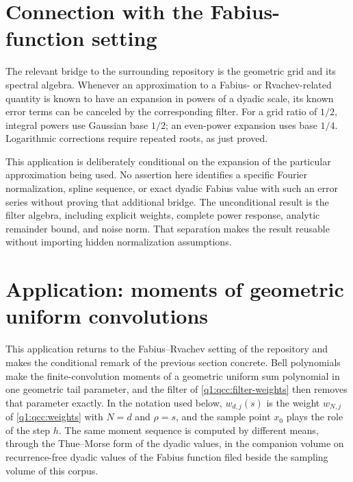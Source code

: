 \documentclass[11pt,a4paper,oneside,openany]{book}
\theoremstyle{definition}
\theoremstyle{remark}
\begin{document}
\section{Connection with the Fabius-function setting}
The relevant bridge to the surrounding repository is the geometric grid and its
spectral algebra. Whenever an approximation to a Fabius- or Rvachev-related
quantity is known to have an expansion in powers of a dyadic scale, its known
error terms can be canceled by the corresponding filter. For a grid ratio of
\(1/2\), integral powers use Gaussian base \(1/2\); an even-power
expansion uses base \(1/4\). Logarithmic corrections require repeated roots,
as just proved.

This application is deliberately conditional on the expansion of the particular
approximation being used. No assertion here identifies a specific Fourier
normalization, spline sequence, or exact dyadic Fabius value with such an error
series without proving that additional bridge. The unconditional result is the
filter algebra, including explicit weights, complete power response, analytic
remainder bound, and noise norm. That separation makes the result reusable
without importing hidden normalization assumptions.

\section{Application: moments of geometric uniform convolutions}
\label{q3:sec:uniform}
This application returns to the Fabius--Rvachev setting of the repository
and makes the conditional remark of the previous section concrete. Bell
polynomials make the finite-convolution moments of a geometric uniform sum
polynomial in one geometric tail parameter, and the filter of
\cref{q1:qcc:filter-weights} then removes that parameter exactly. In the
notation used below, \(w_{d,j}(s)\) is the weight \(w_{N,j}\) of
\eqref{q1:qcc:weights} with \(N=d\) and \(\rho=s\), and the sample point
\(x_0\) plays the role of the step \(h\). The same moment sequence is
computed by different means, through the Thue--Morse form of the dyadic
values, in the companion volume on recurrence-free dyadic values of the
Fabius function filed beside the sampling volume of this corpus.


\end{document}
